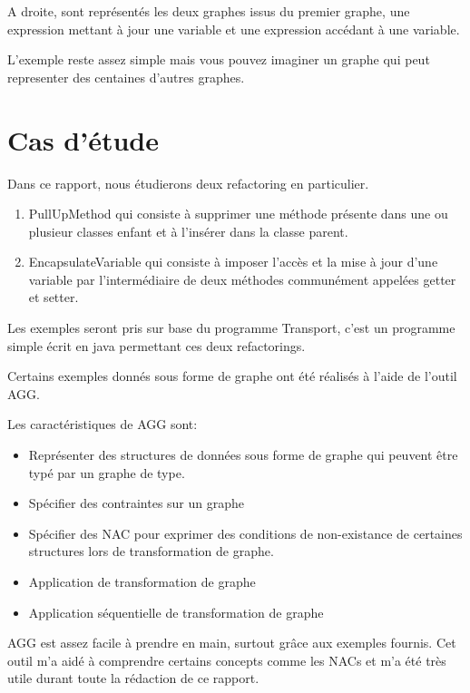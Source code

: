 \documentclass[a4paper, 12pt]{article}
\begin{document}
  A droite, sont représentés les deux graphes issus du premier graphe, une expression mettant à jour une variable et une expression accédant à une variable.

  L'exemple reste assez simple mais vous pouvez imaginer un graphe qui peut representer des centaines d'autres graphes.

  \section{Cas d'étude}

  Dans ce rapport, nous étudierons deux refactoring en particulier.

  \begin{enumerate}
    \item PullUpMethod qui consiste à supprimer une méthode présente dans une ou plusieur classes enfant et à l'insérer dans la classe parent.
    \item EncapsulateVariable qui consiste à imposer l'accès et la mise à jour d'une variable par l'intermédiaire de deux méthodes communément appelées getter et setter.
  \end{enumerate}

  Les exemples seront pris sur base du programme Transport, c'est un programme simple écrit en java permettant ces deux refactorings.

  Certains exemples donnés sous forme de graphe ont été réalisés à l'aide de l'outil AGG.

  Les caractéristiques de AGG sont:

  \begin{itemize}[label=\textbullet]
    \item Représenter des structures de données sous forme de graphe qui peuvent être typé par un graphe de type.
    \item Spécifier des contraintes sur un graphe
    \item Spécifier des NAC pour exprimer des conditions de non-existance de certaines structures lors de transformation de graphe.
    \item Application de transformation de graphe
    \item Application séquentielle de transformation de graphe
  \end{itemize}

  AGG est assez facile à prendre en main, surtout grâce aux exemples fournis. Cet outil m'a aidé à comprendre certains concepts comme les NACs et m'a été très utile durant toute la rédaction de ce rapport.
\end{document}
